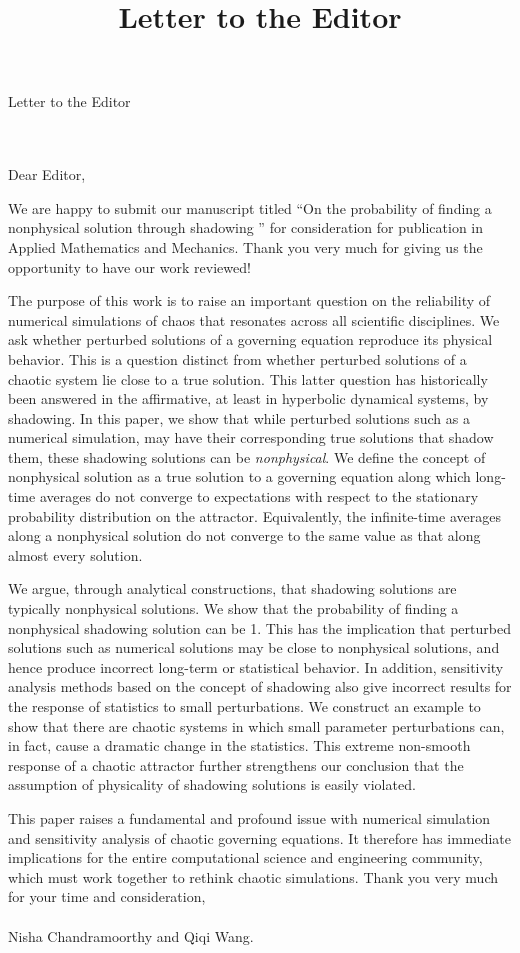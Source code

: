 \documentclass{letter}
\title{Letter to the Editor}
\begin{document}
\hspace{1.6in} 
\begin{large}{Letter to the Editor}\end{large}
\\
\\
Dear Editor,

We are happy to submit our manuscript titled 
``On the probability of finding a nonphysical solution through shadowing ''
for consideration for publication in Applied Mathematics and Mechanics. Thank you very much for giving us the 
opportunity to have our work reviewed!

The purpose of this work is to raise an important question on the reliability of numerical simulations of chaos that resonates across all scientific disciplines. We ask whether perturbed solutions of a 
governing equation reproduce its physical behavior. This is a question distinct from whether perturbed solutions of a chaotic system lie close to a true solution. This latter question has historically been answered in the affirmative, at least in hyperbolic dynamical systems, by shadowing. In this paper, we show that while
perturbed solutions such as a numerical simulation, 
may have their corresponding true solutions that shadow them, these shadowing solutions can be \emph{nonphysical}. We define the concept of nonphysical solution as a true solution to a governing equation along which long-time averages do not converge to expectations with respect to the stationary probability distribution on the attractor. Equivalently, the infinite-time averages along a nonphysical solution do not converge to the same value as that along almost every solution.

We argue, through analytical constructions, that shadowing solutions are typically nonphysical solutions. We show that the probability of finding a nonphysical shadowing solution can be 1. This has the implication that perturbed solutions such as numerical solutions may be close to nonphysical solutions, and hence produce incorrect long-term or statistical behavior. In addition, sensitivity analysis methods based on the concept of shadowing also give incorrect results for the response of statistics to small perturbations. We construct an example to show that 
there are chaotic systems in which small parameter perturbations can, in fact, cause a dramatic change in the statistics. This extreme non-smooth response of a chaotic attractor further strengthens our conclusion that the assumption of physicality of shadowing solutions is easily violated.

This paper raises a fundamental and profound issue with numerical simulation and sensitivity analysis of chaotic governing equations. It therefore has immediate implications for the entire computational science and engineering community, which must work together to rethink chaotic simulations. 
Thank you very much for your time and consideration,
\\
\\
Nisha Chandramoorthy and Qiqi Wang.
\end{document}
